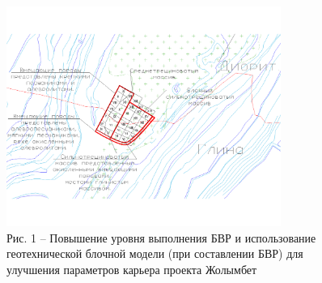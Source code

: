 \begin{figure}[H]
	\centering
	\includegraphics[width=0.8\textwidth]{media/gor/image27}
	\caption*{Рис. 1 -- Повышение уровня выполнения БВР и использование
	геотехнической блочной модели (при составлении БВР) для улучшения
	параметров карьера проекта Жолымбет}
\end{figure}

